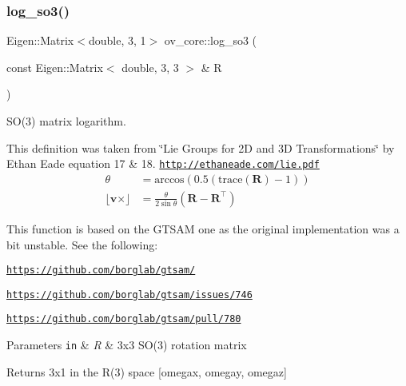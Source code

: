 \subsubsection{\texorpdfstring{log\+\_\+so3()}{log\_so3()}}
{\footnotesize\ttfamily Eigen\+::\+Matrix$<$double, 3, 1$>$ ov\+\_\+core\+::log\+\_\+so3 (\begin{DoxyParamCaption}\item[{const Eigen\+::\+Matrix$<$ double, 3, 3 $>$ \&}]{R }\end{DoxyParamCaption})\hspace{0.3cm}{\ttfamily [inline]}}



S\+O(3) matrix logarithm. 

This definition was taken from \char`\"{}\+Lie Groups for 2\+D and 3\+D Transformations\char`\"{} by Ethan Eade equation 17 \& 18. \href{http://ethaneade.com/lie.pdf}{\tt http\+://ethaneade.\+com/lie.\+pdf} \begin{align*} \theta &= \textrm{arccos}(0.5(\textrm{trace}(\mathbf{R})-1)) \\ \lfloor\mathbf{v}\times\rfloor &= \frac{\theta}{2\sin{\theta}}(\mathbf{R}-\mathbf{R}^\top) \end{align*}

This function is based on the G\+T\+S\+AM one as the original implementation was a bit unstable. See the following\+:
\begin{DoxyItemize}
\item \href{https://github.com/borglab/gtsam/}{\tt https\+://github.\+com/borglab/gtsam/}
\item \href{https://github.com/borglab/gtsam/issues/746}{\tt https\+://github.\+com/borglab/gtsam/issues/746}
\item \href{https://github.com/borglab/gtsam/pull/780}{\tt https\+://github.\+com/borglab/gtsam/pull/780}
\end{DoxyItemize}


\begin{DoxyParams}[1]{Parameters}
\mbox{\tt in}  & {\em R} & 3x3 S\+O(3) rotation matrix \\
\hline
\end{DoxyParams}
\begin{DoxyReturn}{Returns}
3x1 in the R(3) space \mbox{[}omegax, omegay, omegaz\mbox{]} 
\end{DoxyReturn}
\mbox{\label{namespaceov__core_a03115c09fd2fa8a6af23830b9230a683}} 
